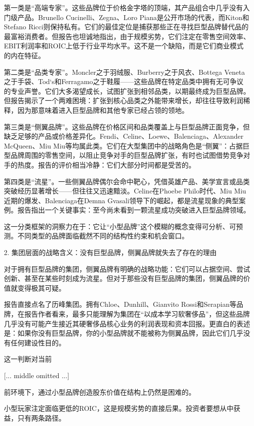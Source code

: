 \documentclass[11pt]{ctexart}
\begin{document}
第一类是“高端专家”。这些品牌位于价格金字塔的顶端，其产品组合中几乎没有入门级产品。Brunello Cucinelli、Zegna、Loro Piana是公开市场的代表，而Kiton和Stefano Ricci则保持私有。它们的最佳定位是捕获那些正在寻找巨型品牌替代品的最富裕消费者。但报告也坦诚地指出，由于规模劣势，它们注定在零售空间效率、EBIT利润率和ROIC上低于行业平均水平。这不是一个缺陷，而是它们商业模式的内在特征。

第二类是“品类专家”。Moncler之于羽绒服、Burberry之于风衣、Bottega Veneta之于手袋、Tod‘s和Ferragamo之于鞋履——这些品牌在特定品类中拥有无可争议的专业声誉。它们大多渴望成长，试图扩张到相邻品类，以期最终成为巨型品牌。但报告揭示了一个两难困境：扩张到核心品类之外能带来增长，却往往导致利润稀释，因为那意味着进入巨型品牌和其他专家已经占领的领地。

第三类是“侧翼品牌”。这些品牌在价格区间和品类覆盖上与巨型品牌正面竞争，但缺乏足够的产品或价格差异化。Fendi、Celine、Loewe、Balenciaga、Alexander McQueen、Miu Miu等均属此类。它们在大型集团中的战略角色是“侧翼”：占据巨型品牌周围的零售空间，以阻止竞争对手的巨型品牌扩张，有时也试图借势竞争对手的热度。报告的评价相当冷静：它们大部分时间都是受苦的。

第四类是“流星”。一些侧翼品牌偶尔会命中靶心，凭借英雄产品、美学宣言或品类突破经历显著增长——但往往又迅速黯淡。Celine在Phoebe Philo时代、Miu Miu近期的爆发、Balenciaga在Demna Gvasali领导下的崛起，都是流星现象的典型案例。报告指出一个关键事实：至今尚未看到一颗流星成功突破进入巨型品牌领域。

这一分类框架的洞察力在于：它让“小型品牌”这个模糊的概念变得可分析、可预测。不同类型的品牌面临截然不同的结构性约束和机会窗口。

2. 集团层面的战略含义：没有巨型品牌，侧翼品牌就失去了存在的理由

对于拥有巨型品牌的集团，侧翼品牌有明确的战略功能：它们可以占据空间、尝试创新、甚至在某些时刻成为流星。但对于那些没有巨型品牌的集团，侧翼品牌的价值就变得极其可疑。

报告直接点名了历峰集团。拥有Chloe、Dunhill、Gianvito Rossi和Serapian等品牌，在报告作者看来，最多只能理解为集团在“以成本学习软奢侈品”，但这些品牌几乎没有可能产生接近其硬奢侈品核心业务的利润表现和资本回报。更直白的表述是：如果你没有巨型品牌，你的小型品牌就不能被称为侧翼品牌，因此它们几乎没有任何建设性目的。

这一判断对当前

[... middle omitted ...]

前环境下，通过小型品牌创造股东价值在结构上仍然是困难的。

小型玩家注定面临更低的ROIC，这是规模劣势的直接后果。投资者要想从中获益，只有两条路径。
\end{document}
